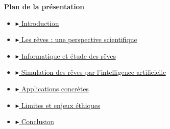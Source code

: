 \documentclass[aspectratio=169]{beamer}
\begin{document}
{



\begin{frame}

\vspace{0.2cm}
\begin{minipage}{0.87\textwidth}
  {\LARGE\bfseries\color{white}Plan de la présentation}

  \vspace{0.8cm}

  {\large
  \begin{itemize}
    \item[] \hyperlink{introduction}{\color{white}$\blacktriangleright$ Introduction}
    \vspace{0.28cm}
    \item[] \hyperlink{perspectives}{\color{white}$\blacktriangleright$ Les rêves : une perspective scientifique}
    \vspace{0.28cm}
    \item[] \hyperlink{informatique}{\color{white}$\blacktriangleright$ Informatique et étude des rêves}
    \vspace{0.28cm}
    \item[] \hyperlink{simulation}{\color{white}$\blacktriangleright$ Simulation des rêves par l’intelligence artificielle}
    \vspace{0.28cm}
    \item[] \hyperlink{applications}{\color{white}$\blacktriangleright$ Applications concrètes}
    \vspace{0.28cm}
    \item[] \hyperlink{limites}{\color{white}$\blacktriangleright$ Limites et enjeux éthiques}
    \vspace{0.28cm}
    \item[] \hyperlink{conclusion}{\color{white}$\blacktriangleright$ Conclusion}
  \end{itemize}
  }
\end{minipage}

\end{frame}
}
\end{document}
